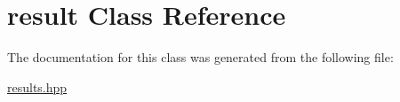 \hypertarget{classresult}{}\section{result Class Reference}
\label{classresult}


The documentation for this class was generated from the following file\+:\begin{DoxyCompactItemize}
\item 
\hyperlink{results_8hpp}{results.\+hpp}\end{DoxyCompactItemize}
